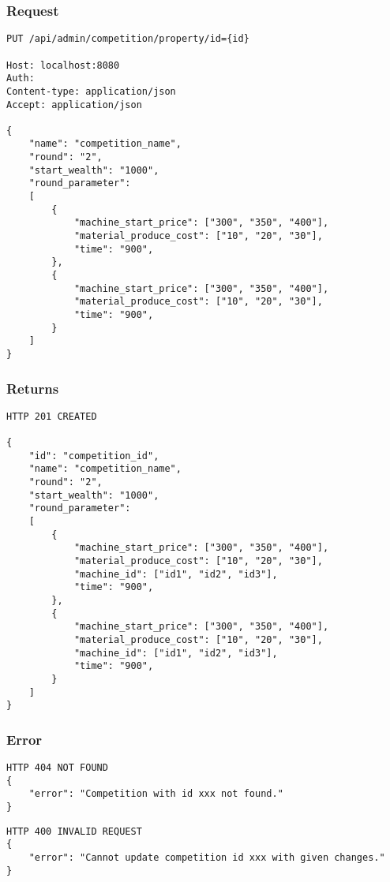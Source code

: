\documentclass{article}
\begin{document}
\subsubsection*{Request}
\begin{lstlisting}
PUT /api/admin/competition/property/id={id}

Host: localhost:8080
Auth:
Content-type: application/json
Accept: application/json

{
    "name": "competition_name",
    "round": "2",
    "start_wealth": "1000",
    "round_parameter":
    [
        {
            "machine_start_price": ["300", "350", "400"],
            "material_produce_cost": ["10", "20", "30"],
            "time": "900",
        },
        {
            "machine_start_price": ["300", "350", "400"],
            "material_produce_cost": ["10", "20", "30"],
            "time": "900",
        }
    ]
}
\end{lstlisting}

\subsubsection*{Returns}
\begin{lstlisting}
HTTP 201 CREATED

{
    "id": "competition_id",
    "name": "competition_name",
    "round": "2",
    "start_wealth": "1000",
    "round_parameter":
    [
        {
            "machine_start_price": ["300", "350", "400"],
            "material_produce_cost": ["10", "20", "30"],
            "machine_id": ["id1", "id2", "id3"],
            "time": "900",
        },
        {
            "machine_start_price": ["300", "350", "400"],
            "material_produce_cost": ["10", "20", "30"],
            "machine_id": ["id1", "id2", "id3"],
            "time": "900",
        }
    ]
}
\end{lstlisting}

\subsubsection*{Error}
\begin{lstlisting}
HTTP 404 NOT FOUND
{
    "error": "Competition with id xxx not found."
}
\end{lstlisting}

\begin{lstlisting}
HTTP 400 INVALID REQUEST
{
    "error": "Cannot update competition id xxx with given changes."
}
\end{lstlisting}
\end{document}
